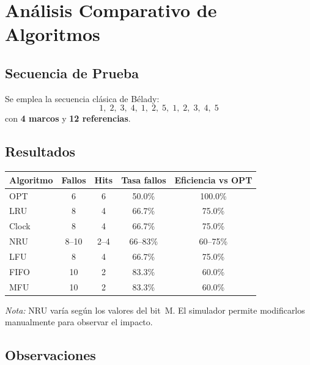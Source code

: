 \documentclass[12pt, a4paper]{article}
\begin{document}
\section{Análisis Comparativo de Algoritmos}

\subsection{Secuencia de Prueba}

Se emplea la secuencia clásica de Bélady:
\[
  1,\; 2,\; 3,\; 4,\; 1,\; 2,\; 5,\; 1,\; 2,\; 3,\; 4,\; 5
\]
con \textbf{4 marcos} y \textbf{12 referencias}.

\subsection{Resultados}

\begin{center}
\begin{tabular}{lcccc}
  \toprule
  Algoritmo & Fallos & Hits & Tasa fallos & Eficiencia vs OPT \\
  \midrule
  OPT   & 6  & 6  & 50.0\% & 100.0\% \\
  LRU   & 8  & 4  & 66.7\% & 75.0\%  \\
  Clock & 8  & 4  & 66.7\% & 75.0\%  \\
  NRU   & 8--10 & 2--4 & 66--83\% & 60--75\% \\
  LFU   & 8  & 4  & 66.7\% & 75.0\%  \\
  FIFO  & 10 & 2  & 83.3\% & 60.0\%  \\
  MFU   & 10 & 2  & 83.3\% & 60.0\%  \\
  \bottomrule
\end{tabular}
\end{center}

\textit{Nota:} NRU varía según los valores del bit~M. El simulador permite modificarlos manualmente para observar el impacto.

\subsection{Observaciones}
\end{document}
